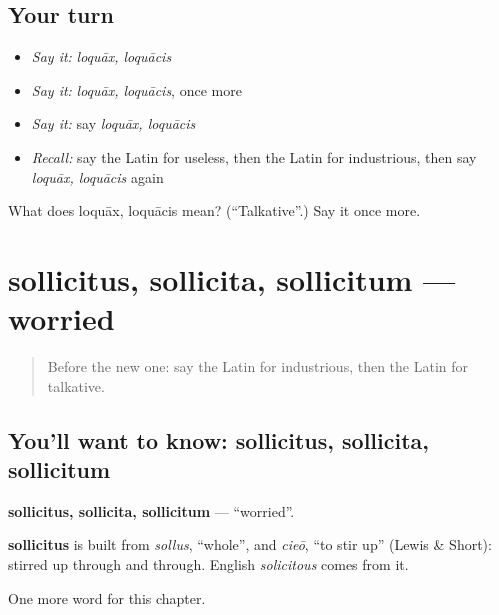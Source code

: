 \subsection*{Your turn}
\begin{itemize}
\raggedright
  \item \emph{Say it:} \emph{loquāx, loquācis}
  \item \emph{Say it:} \emph{loquāx, loquācis}, once more
  \item \emph{Say it:} say \emph{loquāx, loquācis}
  \item \emph{Recall:} say the Latin for useless, then the Latin for industrious, then say \emph{loquāx, loquācis} again
\end{itemize}

\begin{tcolorbox}[breakable,colback=teal!4,colframe=teal!35!black,title={Before you move on}]
What does loquāx, loquācis mean? (\textquotedblleft{}Talkative\textquotedblright{}.) Say it once more.
\end{tcolorbox}
\section[sollicitus, sollicita, sollicitum]{sollicitus, sollicita, sollicitum — worried}

\label{lesson:LA-C241-sollicitus}



\begin{quote}
Before the new one: say the Latin for industrious, then the Latin for talkative.
\end{quote}

\subsection*{You'll want to know: sollicitus, sollicita, sollicitum}
\textbf{sollicitus, sollicita, sollicitum} — \textquotedblleft{}worried\textquotedblright{}.

\begin{cousinweb}
\textbf{sollicitus} is built from \emph{sollus}, \textquotedblleft{}whole\textquotedblright{}, and \emph{cieō}, \textquotedblleft{}to stir up\textquotedblright{} (Lewis \& Short): stirred up through and through. English \emph{solicitous} comes from it.
\end{cousinweb}

\begin{grammarlens}[title={What you've built}]
One more word for this chapter.
\end{grammarlens}

